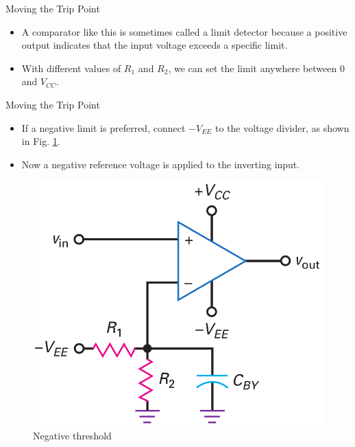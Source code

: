 \documentclass[pdflatex,compress]{beamer}
\begin{document}
\begin{frame}{Moving the Trip Point}
		\begin{itemize}
			\item A comparator like this is sometimes called a limit detector because a positive output indicates that the input voltage exceeds a specific limit.
			\item With different values of $R_1$ and $R_2$, we can set the limit anywhere between 0 and $V_{CC}$.
		\end{itemize}
\end{frame}

\begin{frame}{Moving the Trip Point}
	\begin{multicols}{2}
		\begin{itemize}
			\item If a negative limit is preferred, connect $-V_{EE}$ to the voltage divider, as shown in Fig. \ref{fig:2011c}.
			\item Now a negative reference voltage is applied to the inverting input.
		\end{itemize}
		\vfill\null
		\columnbreak
		\begin{figure}
			\centering
			\includegraphics[width=\linewidth]{img/2011c}
			\caption{Negative threshold}
			\label{fig:2011c}
		\end{figure}
	\end{multicols}
\end{frame}
\end{document}
